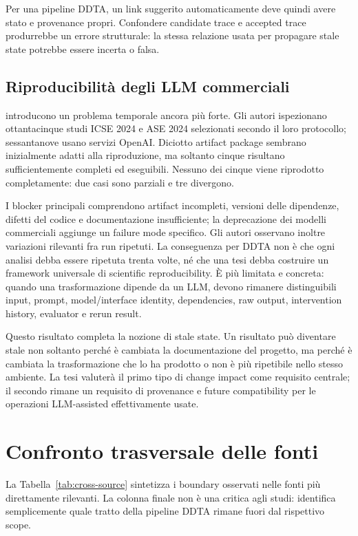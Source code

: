 \documentclass[12pt,a4paper,oneside]{report}
\begin{document}
Per una pipeline DDTA, un link suggerito automaticamente deve quindi avere stato e provenance propri. Confondere candidate trace e accepted trace produrrebbe un errore strutturale: la stessa relazione usata per propagare stale state potrebbe essere incerta o falsa.

\subsection{Riproducibilità degli LLM commerciali}

\citet{angermeir2026reproducibility} introducono un problema temporale ancora più forte. Gli autori ispezionano ottantacinque studi ICSE 2024 e ASE 2024 selezionati secondo il loro protocollo; sessantanove usano servizi OpenAI. Diciotto artifact package sembrano inizialmente adatti alla riproduzione, ma soltanto cinque risultano sufficientemente completi ed eseguibili. Nessuno dei cinque viene riprodotto completamente: due casi sono parziali e tre divergono.

I blocker principali comprendono artifact incompleti, versioni delle dipendenze, difetti del codice e documentazione insufficiente; la deprecazione dei modelli commerciali aggiunge un failure mode specifico. Gli autori osservano inoltre variazioni rilevanti fra run ripetuti. La conseguenza per DDTA non è che ogni analisi debba essere ripetuta trenta volte, né che una tesi debba costruire un framework universale di scientific reproducibility. È più limitata e concreta: quando una trasformazione dipende da un LLM, devono rimanere distinguibili input, prompt, model/interface identity, dependencies, raw output, intervention history, evaluator e rerun result.

Questo risultato completa la nozione di stale state. Un risultato può diventare stale non soltanto perché è cambiata la documentazione del progetto, ma perché è cambiata la trasformazione che lo ha prodotto o non è più ripetibile nello stesso ambiente. La tesi valuterà il primo tipo di change impact come requisito centrale; il secondo rimane un requisito di provenance e future compatibility per le operazioni LLM-assisted effettivamente usate.

\section{Confronto trasversale delle fonti}

La Tabella~\ref{tab:cross-source} sintetizza i boundary osservati nelle fonti più direttamente rilevanti. La colonna finale non è una critica agli studi: identifica semplicemente quale tratto della pipeline DDTA rimane fuori dal rispettivo scope.
\end{document}
